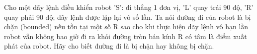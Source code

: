 Cho một dãy lệnh điều khiển robot 'S': đi thẳng 1 đơn vị, 'L' quay trái 90 độ, 'R' quay phải 90 độ; dãy lệnh được lặp lại vô số lần. Ta nói đường đi của robot là bị chặn (bounded) nếu tồn tại một số R sao cho khi thực hiện dãy lệnh vô hạn lần robot vẫn không bao giờ đi ra khỏi đường tròn bán kính R có tâm là điểm xuất phát của robot. Hãy cho biết đường đi là bị chặn hay không bị chặn.